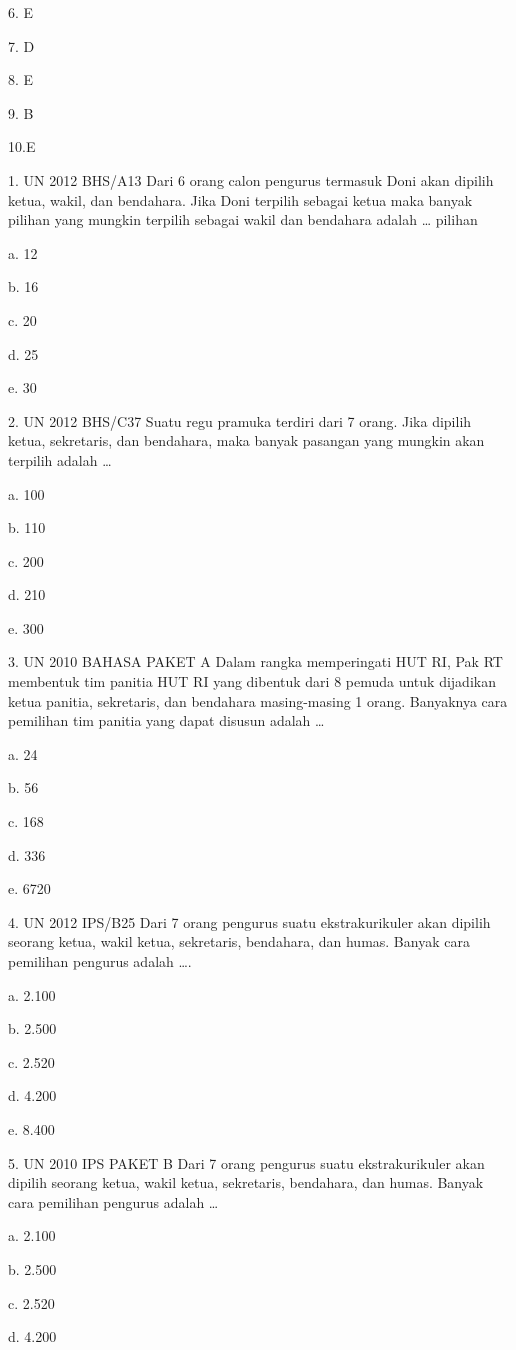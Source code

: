\documentclass[11pt,fleqn]{book} %
\begin{document}
6. E

7. D

8. E

9. B

10.E


1.	UN 2012 BHS/A13
Dari 6 orang calon pengurus termasuk Doni akan dipilih ketua, wakil, dan bendahara. Jika Doni terpilih sebagai ketua maka banyak pilihan yang mungkin terpilih sebagai wakil dan bendahara adalah … pilihan

a.	12

b.	16

c.	20

d.	25

e.	30

2.	UN 2012 BHS/C37
Suatu regu pramuka terdiri dari 7 orang. Jika dipilih ketua, sekretaris, dan bendahara, maka banyak pasangan yang mungkin akan terpilih adalah …

a.	100

b.	110

c.	200

d.	210

e.	300

3.	UN 2010 BAHASA PAKET A 
Dalam rangka memperingati HUT RI, Pak RT membentuk tim panitia HUT RI yang dibentuk dari 8 pemuda untuk dijadikan ketua panitia, sekretaris, dan bendahara masing-masing 1 orang. Banyaknya cara pemilihan tim panitia yang dapat disusun adalah …

a.	24

b.	56

c.	168

d.	336

e.	6720


4.	UN 2012 IPS/B25
Dari 7 orang pengurus suatu ekstrakurikuler akan dipilih seorang ketua, wakil ketua, sekretaris, bendahara, dan humas. Banyak cara pemilihan pengurus adalah ….

a.	2.100

b.	2.500

c.	2.520


d.	4.200

e.	8.400

5.	UN 2010 IPS PAKET B 
Dari 7 orang pengurus suatu ekstrakurikuler akan dipilih seorang ketua, wakil ketua, sekretaris, bendahara, dan humas. Banyak cara pemilihan pengurus adalah …

a.	2.100

b.	2.500

c.	2.520

d.	4.200
\end{document}

